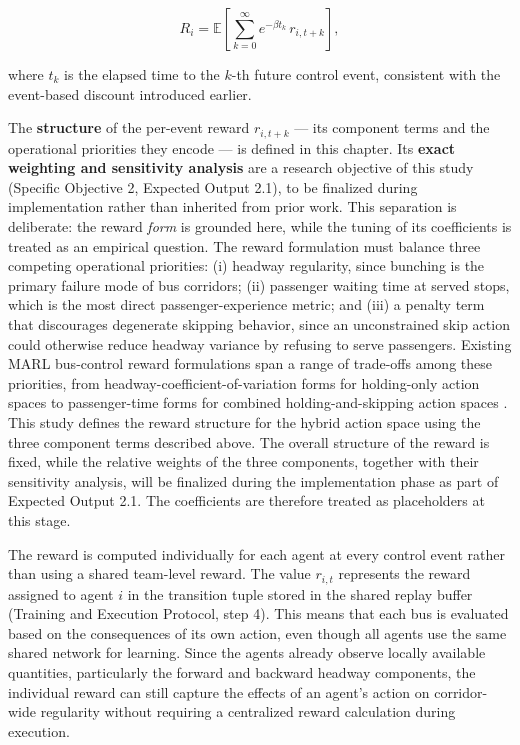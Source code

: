 \begin{equation}
R_i = \mathbb{E}\!\left[\sum_{k=0}^{\infty} e^{-\beta t_k}\, r_{i, t+k}\right],
\end{equation}

where $t_k$ is the elapsed time to the $k$-th future control event, consistent with the event-based discount introduced earlier.

The \textbf{structure} of the per-event reward $r_{i, t+k}$ --- its component terms and the operational priorities they encode --- is defined in this chapter. Its \textbf{exact weighting and sensitivity analysis} are a research objective of this study (Specific Objective 2, Expected Output 2.1), to be finalized during implementation rather than inherited from prior work. This separation is deliberate: the reward \textit{form} is grounded here, while the tuning of its coefficients is treated as an empirical question. The reward formulation must balance three competing operational priorities: (i) headway regularity, since bunching is the primary failure mode of bus corridors; (ii) passenger waiting time at served stops, which is the most direct passenger-experience metric; and (iii) a penalty term that discourages degenerate skipping behavior, since an unconstrained skip action could otherwise reduce headway variance by refusing to serve passengers. Existing MARL bus-control reward formulations span a range of trade-offs among these priorities, from headway-coefficient-of-variation forms for holding-only action spaces \cite{Wangsun,Wang2023MultiObj} to passenger-time forms for combined holding-and-skipping action spaces \cite{Rodriguez2023Cooperative}. This study defines the reward structure for the hybrid action space using the three component terms described above. The overall structure of the reward is fixed, while the relative weights of the three components, together with their sensitivity analysis, will be finalized during the implementation phase as part of Expected Output 2.1. The coefficients are therefore treated as placeholders at this stage.

The reward is computed individually for each agent at every control event rather than using a shared team-level reward. The value $r_{i,t}$ represents the reward assigned to agent $i$ in the transition tuple stored in the shared replay buffer (Training and Execution Protocol, step 4). This means that each bus is evaluated based on the consequences of its own action, even though all agents use the same shared network for learning. Since the agents already observe locally available quantities, particularly the forward and backward headway components, the individual reward can still capture the effects of an agent's action on corridor-wide regularity without requiring a centralized reward calculation during execution.

